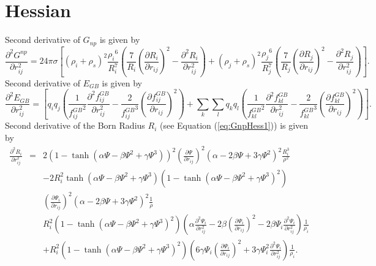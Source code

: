 \documentclass[12pt]{article}
\begin{document}
\section{Hessian}
Second derivative of $G_{np}$ is given by
\begin{equation}
\label{eq:GnpHess1}
\frac{\partial^{2} G^{np}}{\partial r_{ij}^{2}} = 24{\pi}{\sigma}\left[ ({\rho}_{i} + {\rho}_{s})^{2}\frac{{\rho_{i}}^{6}}{R_{i}^{7}}
\left(\frac{7}{R_{i}}\left(\frac{\partial R_{i}}{\partial r_{ij}}\right)^{2} - \frac{\partial^{2}R_{i}}{\partial r_{ij}^{2}}\right)+ ({\rho}_{j} + {\rho}_{s})^{2}
\frac{{\rho_{j}}^{6}}{R_{j}^{7}} \left(\frac{7}{R_{j}}\left(\frac{\partial R_{j}}{\partial r_{ij}}\right)^{2} -  \frac{\partial^{2}R_{j}}{\partial r_{ij}^{2}}\right) \right]. 
\end{equation}
Second derivative of $E_{GB}$ is given by
\begin{equation}
\frac{\partial^{2} E_{GB}}{\partial r_{ij}^{2}} = \left[ q_{i}q_{j}\left(\frac{1}{{f_{ij}^{GB}}^{2}}\frac{\partial^{2}f_{ij}^{GB}}{\partial r_{ij}^{2}} - \frac{2}{{f_{ij}^{GB}}^{3}}\left(\frac{\partial f_{ij}^{GB}}{\partial r_{ij}}\right)^{2} \right) + \displaystyle\sum_{k}\displaystyle\sum_{l}q_{k}q_{l} \left( \frac{1}{{f_{kl}^{GB}}^{2}}\frac{\partial^{2}f_{kl}^{GB}}{\partial r_{ij}^{2}} - \frac{2}{{f_{kl}^{GB}}^{3}}\left(\frac{\partial f_{kl}^{GB}}{\partial r_{ij}}\right)^{2}\right) \right].
\end{equation}
Second derivative of the Born Radius $R_{i}$ (see Equation (\ref{eq:GnpHess1})) is given by
\begin{eqnarray}
\frac{\partial^{2}R_{i}}{\partial r_{ij}^{2}} & = & 2(1 - \tanh({\alpha}{\Psi} - {\beta}{\Psi}^{2} + {\gamma}{\Psi}^{3}))^{2}(\frac{\partial {\Psi}}{\partial r_{ij}})^{2}({\alpha} - 2{\beta}{\Psi} + 3{\gamma}{\Psi}^{2})^{2}\frac{R_{i}^{3}}{\rho^{2}} \\ \nonumber
& & - 2R_{i}^{2} \tanh({\alpha}{\Psi} - {\beta}{\Psi}^{2} + {\gamma}{\Psi}^{3})(1 -{\tanh({\alpha}{\Psi} - {\beta}{\Psi}^{2} + {\gamma}{\Psi}^{3})}^{2})\\ \nonumber 
& &\left(\frac{\partial {\Psi}_{i}}{\partial r_{ij}}\right)^{2}({\alpha} - 2{\beta}{\Psi} + 3{\gamma}{\Psi}^{2})^{2}\frac{1}{\rho} \\ \nonumber
& & R_{i}^{2}(1 - \tanh({\alpha}{\Psi} - {\beta}{\Psi}^{2} + {\gamma}{\Psi}^{3})^{2})({\alpha}\frac{\partial^{2}{\Psi}_{i}}{\partial r_{ij}^{2}} - 2{\beta}(\frac{\partial {\Psi}_{i}}{\partial r_{ij}})^{2} - 2{\beta}{\Psi}_{i}\frac{\partial^{2}{\Psi}_{i}}{\partial r_{ij}^{2}})\frac{1}{{\rho}_{i}} \\ \nonumber
& & +R_{i}^{2}(1 - \tanh({\alpha}{\Psi} - {\beta}{\Psi}^{2} + {\gamma}{\Psi}^{3})^{2})( 6{\gamma}{\Psi}_{i}(\frac{\partial {\Psi}_{i}}{\partial r_{ij}})^{2} + 3{\gamma}{\Psi}_{i}^{2}\frac{\partial^{2}{\Psi}_{i}}{\partial r_{ij}^{2}})\frac{1}{{\rho}_{i}}.
\end{eqnarray}
\end{document}
